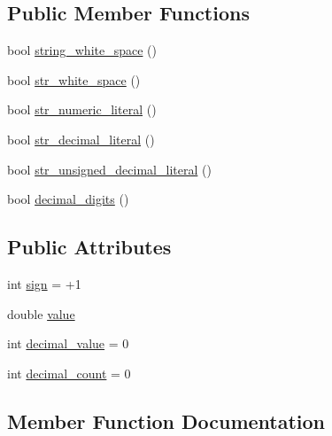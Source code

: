 \subsection*{Public Member Functions}
\begin{DoxyCompactItemize}
\item 
bool \hyperlink{struct_string_converter_a1e85921aea2e3ee80d7a4cf75186313a}{string\+\_\+white\+\_\+space} ()
\item 
bool \hyperlink{struct_string_converter_a00a8cb0a41ae9fd97fd521f4dc26d718}{str\+\_\+white\+\_\+space} ()
\item 
bool \hyperlink{struct_string_converter_aa916c3691c6f0f157c0c14e2f548653d}{str\+\_\+numeric\+\_\+literal} ()
\item 
bool \hyperlink{struct_string_converter_ac17dc96b85821b07801f2330490f1df9}{str\+\_\+decimal\+\_\+literal} ()
\item 
bool \hyperlink{struct_string_converter_a5fa91c26f933a1a95e2c0ebb6924edee}{str\+\_\+unsigned\+\_\+decimal\+\_\+literal} ()
\item 
bool \hyperlink{struct_string_converter_a5d2fcd458c5956ea40554c8ea2462878}{decimal\+\_\+digits} ()
\end{DoxyCompactItemize}
\subsection*{Public Attributes}
\begin{DoxyCompactItemize}
\item 
int \hyperlink{struct_string_converter_ad3171cef3031bb13d3a2d36d1136036d}{sign} = +1
\item 
double \hyperlink{struct_string_converter_ad0ff89f7e2ea10804590fc2ac7e9b3b2}{value}
\item 
int \hyperlink{struct_string_converter_a21c545dac997e7a4ac950ae05dc03f36}{decimal\+\_\+value} = 0
\item 
int \hyperlink{struct_string_converter_ae43b8b7813c327a287d001e62a37733a}{decimal\+\_\+count} = 0
\end{DoxyCompactItemize}


\subsection{Member Function Documentation}
\mbox{\label{struct_string_converter_a5d2fcd458c5956ea40554c8ea2462878}} 
